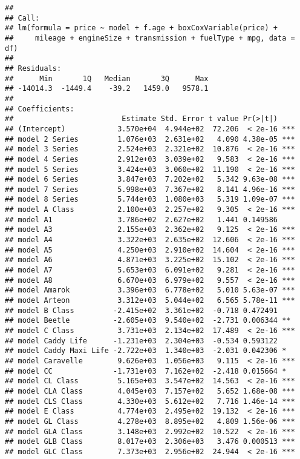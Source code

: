 \documentclass[
]{article}
\begin{document}
\begin{verbatim}
## 
## Call:
## lm(formula = price ~ model + f.age + boxCoxVariable(price) + 
##     mileage + engineSize + transmission + fuelType + mpg, data = df)
## 
## Residuals:
##      Min       1Q   Median       3Q      Max 
## -14014.3  -1449.4    -39.2   1459.0   9578.1 
## 
## Coefficients:
##                         Estimate Std. Error t value Pr(>|t|)    
## (Intercept)            3.570e+04  4.944e+02  72.206  < 2e-16 ***
## model 2 Series         1.076e+03  2.631e+02   4.090 4.38e-05 ***
## model 3 Series         2.524e+03  2.321e+02  10.876  < 2e-16 ***
## model 4 Series         2.912e+03  3.039e+02   9.583  < 2e-16 ***
## model 5 Series         3.424e+03  3.060e+02  11.190  < 2e-16 ***
## model 6 Series         3.847e+03  7.202e+02   5.342 9.63e-08 ***
## model 7 Series         5.998e+03  7.367e+02   8.141 4.96e-16 ***
## model 8 Series         5.744e+03  1.080e+03   5.319 1.09e-07 ***
## model A Class          2.100e+03  2.257e+02   9.305  < 2e-16 ***
## model A1               3.786e+02  2.627e+02   1.441 0.149586    
## model A3               2.155e+03  2.362e+02   9.125  < 2e-16 ***
## model A4               3.322e+03  2.635e+02  12.606  < 2e-16 ***
## model A5               4.250e+03  2.910e+02  14.604  < 2e-16 ***
## model A6               4.871e+03  3.225e+02  15.102  < 2e-16 ***
## model A7               5.653e+03  6.091e+02   9.281  < 2e-16 ***
## model A8               6.670e+03  6.979e+02   9.557  < 2e-16 ***
## model Amarok           3.396e+03  6.778e+02   5.010 5.63e-07 ***
## model Arteon           3.312e+03  5.044e+02   6.565 5.78e-11 ***
## model B Class         -2.415e+02  3.361e+02  -0.718 0.472491    
## model Beetle          -2.605e+03  9.540e+02  -2.731 0.006344 ** 
## model C Class          3.731e+03  2.134e+02  17.489  < 2e-16 ***
## model Caddy Life      -1.231e+03  2.304e+03  -0.534 0.593122    
## model Caddy Maxi Life -2.722e+03  1.340e+03  -2.031 0.042306 *  
## model Caravelle        9.626e+03  1.056e+03   9.115  < 2e-16 ***
## model CC              -1.731e+03  7.162e+02  -2.418 0.015664 *  
## model CL Class         5.165e+03  3.547e+02  14.563  < 2e-16 ***
## model CLA Class        4.045e+03  7.157e+02   5.652 1.68e-08 ***
## model CLS Class        4.330e+03  5.612e+02   7.716 1.46e-14 ***
## model E Class          4.774e+03  2.495e+02  19.132  < 2e-16 ***
## model GL Class         4.278e+03  8.895e+02   4.809 1.56e-06 ***
## model GLA Class        3.148e+03  2.992e+02  10.522  < 2e-16 ***
## model GLB Class        8.017e+03  2.306e+03   3.476 0.000513 ***
## model GLC Class        7.373e+03  2.956e+02  24.944  < 2e-16 ***

\end{verbatim}
\end{document}
